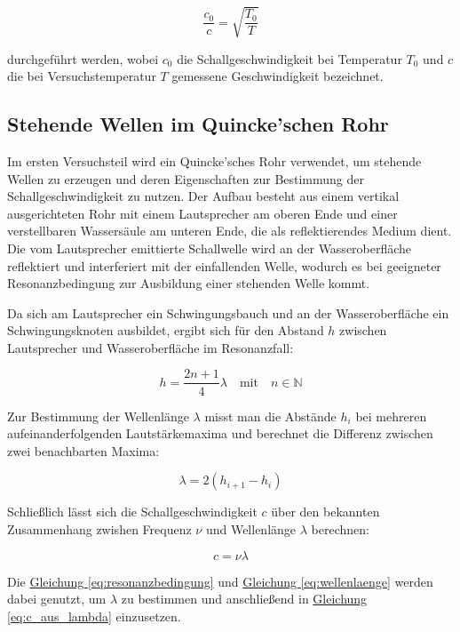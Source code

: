 \begin{equation}
\frac{c_0}{c} = \sqrt{\frac{T_0}{T}}
\label{eq:normbedingungen}
\end{equation}

durchgeführt werden, wobei $c_0$ die Schallgeschwindigkeit bei Temperatur $T_0$ und $c$ die bei Versuchstemperatur $T$ gemessene Geschwindigkeit bezeichnet.

\subsection{Stehende Wellen im Quincke’schen Rohr}

Im ersten Versuchsteil wird ein Quincke’sches Rohr verwendet, um stehende Wellen zu erzeugen und deren Eigenschaften zur Bestimmung der Schallgeschwindigkeit zu nutzen. Der Aufbau besteht aus einem vertikal ausgerichteten Rohr mit einem Lautsprecher am oberen Ende und einer verstellbaren Wassersäule am unteren Ende, die als reflektierendes Medium dient. Die vom Lautsprecher emittierte Schallwelle wird an der Wasseroberfläche reflektiert und interferiert mit der einfallenden Welle, wodurch es bei geeigneter Resonanzbedingung zur Ausbildung einer stehenden Welle kommt.

Da sich am Lautsprecher ein Schwingungsbauch und an der Wasseroberfläche ein Schwingungsknoten ausbildet, ergibt sich für den Abstand $h$ zwischen Lautsprecher und Wasseroberfläche im Resonanzfall:

\begin{equation}
h = \frac{2n + 1}{4} \lambda \quad \text{mit} \quad n \in \mathbb{N}
\label{eq:resonanzbedingung}
\end{equation}

Zur Bestimmung der Wellenlänge $\lambda$ misst man die Abstände $h_i$ bei mehreren aufeinanderfolgenden Lautstärkemaxima und berechnet die Differenz zwischen zwei benachbarten Maxima:

\begin{equation}
\lambda = 2(h_{i+1} - h_i)
\label{eq:wellenlaenge}
\end{equation}

Schließlich lässt sich die Schallgeschwindigkeit $c$ über den bekannten Zusammenhang zwishen Frequenz $\nu$ und Wellenlänge $\lambda$ berechnen:

\begin{equation}
c = \nu \lambda
\label{eq:c_aus_lambda}
\end{equation}

Die \hyperref[eq:resonanzbedingung]{Gleichung \ref*{eq:resonanzbedingung}} und \hyperref[eq:wellenlaenge]{Gleichung \ref*{eq:wellenlaenge}} werden dabei genutzt, um $\lambda$ zu bestimmen und anschließend in \hyperref[eq:c_aus_lambda]{Gleichung \ref*{eq:c_aus_lambda}} einzusetzen.

